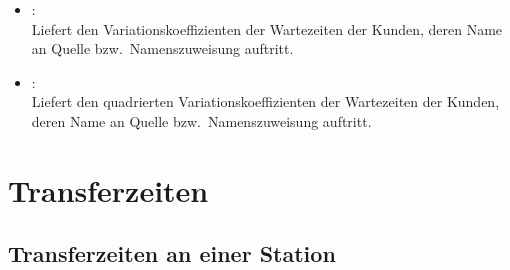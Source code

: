 \begin{itemize}
\item
{}:\\
Liefert den Variationskoeffizienten der Wartezeiten der Kunden, deren Name an Quelle bzw.\ Namenszuweisung  auftritt.

\item
{}:\\
Liefert den quadrierten Variationskoeffizienten der Wartezeiten der Kunden, deren Name an Quelle bzw.\ Namenszuweisung  auftritt.

\end{itemize}



\section{Transferzeiten}



\subsection{Transferzeiten an einer Station}

